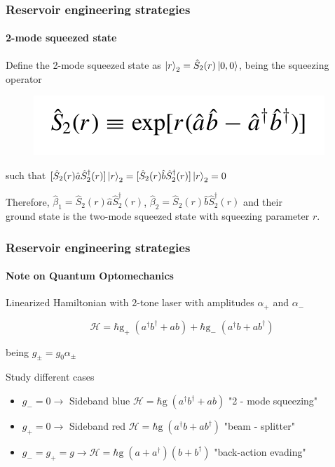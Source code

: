 \documentclass[aspectratio=43]{beamer}
\begin{document}
\begin{frame}
	
	\frametitle{Reservoir engineering strategies}
	\framesubtitle{2-mode squeezed state}
	
	Define the {\color{blue}2-mode squeezed state} as $\ket{r}_{2} = \hat{S}_{2}(r) \ket{0,0}$, being the squeezing operator
	\begin{figure}
		\includegraphics[width = 4.5 cm]{plots/2_squeezed_mode.png}
	\end{figure}	

	such that $[\hat{S}_{2}(r) \hat{a} \hat{S}_{2}^{\dagger}(r)]\ket{r}_{2} = [\hat{S}_{2}(r) \hat{b} \hat{S}_{2}^{\dagger}(r)]\ket{r}_{2} = 0$\\
	
	\vspace{0.5cm}
	
	Therefore, $\hat{\beta}_{1} = \hat{S}_{2}(r) \hat{a} \hat{S}_{2}^{\dagger}(r)$, $\hat{\beta}_{2} = \hat{S}_{2}(r) \hat{b} \hat{S}_{2}^{\dagger}(r)$ and their\\ground state is the two-mode squeezed state with squeezing parameter $r$.

\end{frame}

\begin{frame}
	
	\frametitle{Reservoir engineering strategies}
	\framesubtitle{Note on Quantum Optomechanics}
	
	Linearized Hamiltonian with 2-tone laser with amplitudes $\alpha_{+}$ and $\alpha_{-}$
	
	\begin{equation}
	\mathcal{H} = \hbar \textrm{g}_{+} \; (a^{\dagger}b^{\dagger} + ab) + \hbar \textrm{g}_{-} \; (a^{\dagger}b + ab^{\dagger}) \nonumber
	\end{equation}
	
	being $g_{\pm} = g_{0} \alpha_{\pm}$\\

	\vspace{0.5 cm}
	
	Study different cases
	
	\begin{itemize}
		\item $g_{-} = 0 \longrightarrow$ Sideband blue $\mathcal{H} = \hbar \textrm{g} \; (a^{\dagger}b^{\dagger} + ab)$ "2 - mode squeezing"
		\item $g_{+} = 0 \longrightarrow$ Sideband red $\mathcal{H} = \hbar \textrm{g} \; (a^{\dagger}b + ab^{\dagger})$ {\color{blue}"beam - splitter"}
		\item $g_{-} = g_{+} = g \longrightarrow \mathcal{H} = \hbar \textrm{g} \; (a + a^{\dagger})(b + b^{\dagger})$ "back-action evading"
	\end{itemize}	

\end{frame}
\end{document}
